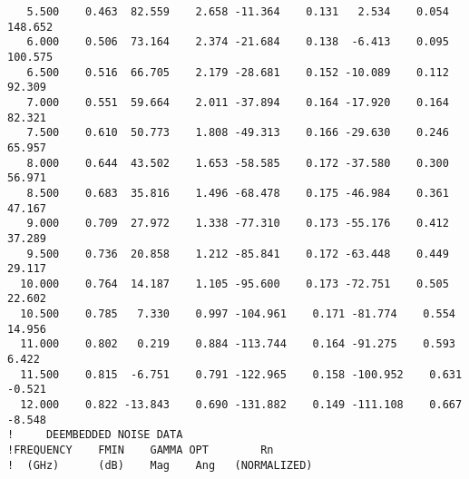 \begin{verbatim}
   5.500    0.463  82.559    2.658 -11.364    0.131   2.534    0.054 148.652
   6.000    0.506  73.164    2.374 -21.684    0.138  -6.413    0.095 100.575
   6.500    0.516  66.705    2.179 -28.681    0.152 -10.089    0.112  92.309
   7.000    0.551  59.664    2.011 -37.894    0.164 -17.920    0.164  82.321
   7.500    0.610  50.773    1.808 -49.313    0.166 -29.630    0.246  65.957
   8.000    0.644  43.502    1.653 -58.585    0.172 -37.580    0.300  56.971
   8.500    0.683  35.816    1.496 -68.478    0.175 -46.984    0.361  47.167
   9.000    0.709  27.972    1.338 -77.310    0.173 -55.176    0.412  37.289
   9.500    0.736  20.858    1.212 -85.841    0.172 -63.448    0.449  29.117
  10.000    0.764  14.187    1.105 -95.600    0.173 -72.751    0.505  22.602
  10.500    0.785   7.330    0.997 -104.961    0.171 -81.774    0.554  14.956
  11.000    0.802   0.219    0.884 -113.744    0.164 -91.275    0.593   6.422
  11.500    0.815  -6.751    0.791 -122.965    0.158 -100.952    0.631  -0.521
  12.000    0.822 -13.843    0.690 -131.882    0.149 -111.108    0.667  -8.548
!     DEEMBEDDED NOISE DATA
!FREQUENCY    FMIN    GAMMA OPT        Rn
!  (GHz)      (dB)    Mag    Ang   (NORMALIZED)
\end{verbatim}

